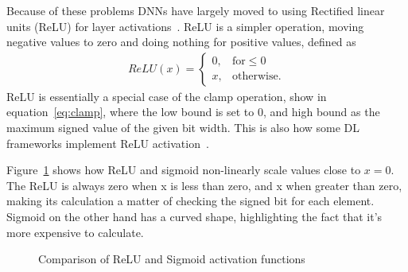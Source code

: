 \documentclass[12pt,a4paper,english
]{tunithesis}
\begin{document}
Because of these problems DNNs have largely moved to using Rectified linear units (ReLU) for layer activations~\cite{krizhevsky_imagenet_2012}.
ReLU is a simpler operation, moving negative values to zero and doing nothing for positive values, defined as
\begin{align}
ReLU(x) =
\begin{cases}
0, & \text{for} \leq 0 \\
  x, &  \text{otherwise}.
\end{cases}
\end{align}
ReLU is essentially a special case of the clamp operation, show in equation~\ref{eq:clamp}, where the low bound is set to 0, and high bound as the maximum signed value of the given bit width. This is also how some DL frameworks implement ReLU activation~\cite{TVM}.

Figure~\ref{fig:activation-functions} shows how ReLU and sigmoid non-linearly scale values close to $x=0$. The ReLU is always zero when x is less than zero, and x when greater than zero, making its calculation a matter of checking the signed bit for each element. Sigmoid on the other hand has a curved shape, highlighting the fact that it's more expensive to calculate.

\begin{figure}[ht]
\centering
\begin{minipage}[t]{.45\textwidth}
  \centering
\end{minipage}
\begin{minipage}[t]{.45\textwidth}
  \centering
\end{minipage}
\caption{Comparison of ReLU and Sigmoid activation functions}
\label{fig:activation-functions}
\end{figure}
\end{document}
